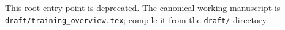 \documentclass{article}
\begin{document}
This root entry point is deprecated. The canonical working manuscript is
\texttt{draft/training\_overview.tex}; compile it from the
\texttt{draft/} directory.
\end{document}

